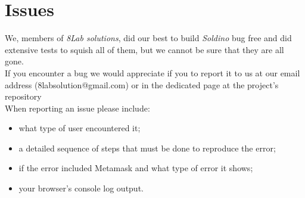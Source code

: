 \section{Issues}
We, members of \textit{8Lab solutions}, did our best to build \textit{Soldino} 
bug free and did extensive tests to squish all of them, but we cannot be sure 
that they are all gone.\\
If you encounter a bug we would appreciate if you to report it to us at our 
email address (8labsolution@gmail.com) or in the dedicated page at the 
project's repository %
\\When reporting an issue please include:
\begin{itemize}
	\item what type of user encountered it;
	\item a detailed sequence of steps that must be done to reproduce the error;
	\item if the error included Metamask and what type of error it shows;
	\item your browser's console log output.
\end{itemize}

